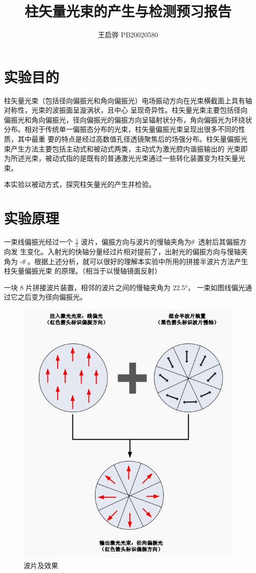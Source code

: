 \documentclass{article}
\title{\songti \zihao{2}\bfseries 柱矢量光束的产生与检测预习报告}
\author{王启骅 PB20020580}
\begin{document}
	\maketitle
	\section{实验目的}
	柱矢量光束（包括径向偏振光和角向偏振光）电场振动方向在光束横截面上具有轴对称性，光束的波振面呈漩涡状，且中心
	呈现奇异性。柱矢量光束主要包括径向偏振光和角向偏振光，径向偏振光的偏振方向呈辐射状分布，角向偏振光为环绕状分布。相对于传统单一偏振态分布的光束，柱矢量偏振光束呈现出很多不同的性质，其中最重
	要的特点是经过高数值孔径透镜聚焦后的场强分布。柱矢量偏振光束产生方法主要包括主动式和被动式两类，主动式为激光腔内谐振输出的
	光束即为所述光束，被动式指的是既有的普通激光光束通过一些转化装置变为柱矢量光束。
	
	本实验以被动方式，探究柱矢量光的产生并检验。
	\section{实验原理}
	一束线偏振光经过一个$ \frac{\lambda}{2} $ 波片，偏振方向与波片的慢轴夹角为$\theta$，透射后其偏振方向发
	生变化。入射光的快轴分量经过片相对提前了，出射光的偏振方向与慢轴夹角为
	-$\theta$。根据上述分析，就可以很好的理解本实验中所用的拼接半波片方法产生柱矢量偏振光束
	的原理。（相当于以慢轴镜面反射）
	
	
	一块 8 片拼接波片装置，相邻的波片之间的慢轴夹角为 22.5°，
	一束如图线偏光通过它之后变为径向偏振光。
	\begin{figure}[!h]
		
		\centering
		\includegraphics[scale=0.56]{a}
		\caption{\heiti{}波片及效果}
		
	\end{figure}
\end{document}

